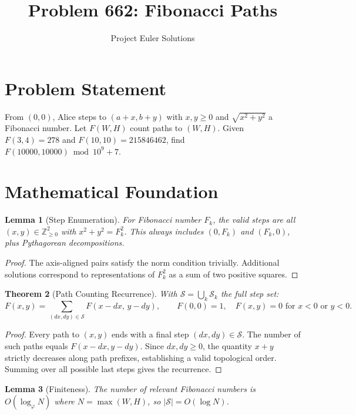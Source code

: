 \documentclass[11pt]{article}
\title{Problem 662: Fibonacci Paths}
\author{Project Euler Solutions}
\date{}
\newtheorem{theorem}{Theorem}
\newtheorem{lemma}[theorem]{Lemma}
\begin{document}
\maketitle

\section{Problem Statement}

From $(0,0)$, Alice steps to $(a+x, b+y)$ with $x,y \ge 0$ and $\sqrt{x^2+y^2}$ a Fibonacci number. Let $F(W,H)$ count paths to $(W,H)$. Given $F(3,4)=278$ and $F(10,10)=215846462$, find $F(10000,10000) \bmod 10^9+7$.

\section{Mathematical Foundation}

\begin{lemma}[Step Enumeration]
For Fibonacci number $F_k$, the valid steps are all $(x,y) \in \mathbb{Z}_{\ge 0}^2$ with $x^2+y^2 = F_k^2$. This always includes $(0,F_k)$ and $(F_k,0)$, plus Pythagorean decompositions.
\end{lemma}

\begin{proof}
The axis-aligned pairs satisfy the norm condition trivially. Additional solutions correspond to representations of $F_k^2$ as a sum of two positive squares.
\end{proof}

\begin{theorem}[Path Counting Recurrence]
With $\mathcal{S} = \bigcup_k \mathcal{S}_k$ the full step set:
\[
F(x,y) = \sum_{(dx,dy) \in \mathcal{S}} F(x-dx,\, y-dy), \qquad F(0,0) = 1,\quad F(x,y)=0 \text{ for } x<0 \text{ or } y<0.
\]
\end{theorem}

\begin{proof}
Every path to $(x,y)$ ends with a final step $(dx,dy) \in \mathcal{S}$. The number of such paths equals $F(x-dx,y-dy)$. Since $dx,dy \ge 0$, the quantity $x+y$ strictly decreases along path prefixes, establishing a valid topological order. Summing over all possible last steps gives the recurrence.
\end{proof}

\begin{lemma}[Finiteness]
The number of relevant Fibonacci numbers is $O(\log_\varphi N)$ where $N = \max(W,H)$, so $|\mathcal{S}| = O(\log N)$.
\end{lemma}
\end{document}
